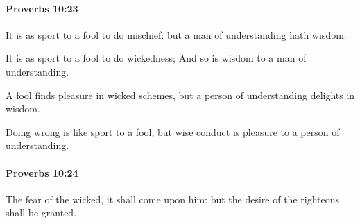 		\paragraph{Proverbs 10:23} %
			\label{PROVERBS-10-23}

			It is as sport to a fool to do mischief: but a man of understanding hath wisdom.

			\begin{versebox}
					\item[BHS] 
					\item[ASV] It is as sport to a fool to do wickedness; And so is wisdom to a man of understanding.
					\item[NIV] A fool finds pleasure in wicked schemes, but a person of understanding delights in wisdom.
					\item[NRSV] Doing wrong is like sport to a fool, but wise conduct is pleasure to a person of understanding.
			\end{versebox}

		\paragraph{Proverbs 10:24} %
			\label{PROVERBS-10-24}

			The fear of the wicked, it shall come upon him: but the desire of the righteous shall be granted.


